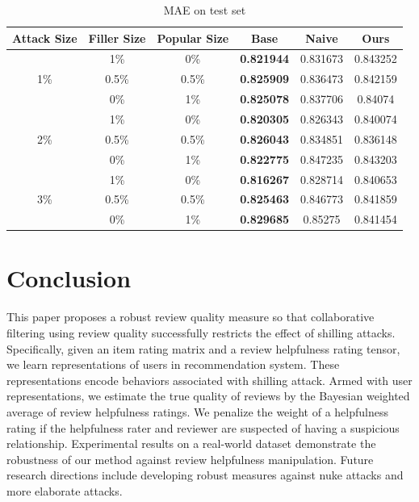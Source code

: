 \documentclass[master,english,final]{kaist-ucs}
\begin{document}
\begin{table}[h]
\caption{MAE on test set}
\label{resultMAE}
\begin{center}
\begin{tabular}{|c|c|c|c|c|c|}
\hline
\textbf{Attack Size} & \textbf{Filler Size} & \textbf{Popular Size} & \textbf{Base} & \textbf{Naive} & \textbf{Ours}     \\ \hline
\multirow{3}{*}{1\%} & 1\%                  & 0\%                   & \textbf{0.821944}      & 0.831673       & 0.843252 \\ \cline{2-6}
                     & 0.5\%               & 0.5\%                & \textbf{0.825909}      & 0.836473       & 0.842159 \\ \cline{2-6}
                     & 0\%                  & 1\%                   & \textbf{0.825078}      & 0.837706       & 0.84074  \\ \hline
\multirow{3}{*}{2\%} & 1\%                  & 0\%                   & \textbf{0.820305}      & 0.826343       & 0.840074 \\ \cline{2-6}
                     & 0.5\%               & 0.5\%                & \textbf{0.826043}      & 0.834851       & 0.836148 \\ \cline{2-6}
                     & 0\%                  & 1\%                   & \textbf{0.822775}      & 0.847235       & 0.843203 \\ \hline
\multirow{3}{*}{3\%} & 1\%                  & 0\%                   & \textbf{0.816267}      & 0.828714       & 0.840653 \\ \cline{2-6}
                     & 0.5\%               & 0.5\%                & \textbf{0.825463}      & 0.846773       & 0.841859 \\ \cline{2-6}
                     & 0\%                  & 1\%                   & \textbf{0.829685}      & 0.85275        & 0.841454 \\ \hline
\end{tabular}
\end{center}
\end{table}


\chapter{Conclusion}
This paper proposes a robust review quality measure so that collaborative filtering using review quality successfully restricts the effect of shilling attacks.
Specifically, given an item rating matrix and a review helpfulness rating tensor, we learn representations of users in recommendation system.
These representations encode behaviors associated with shilling attack.
Armed with user representations, we estimate the true quality of reviews by the Bayesian weighted average of review helpfulness ratings.
We penalize the weight of a helpfulness rating if the helpfulness rater and reviewer are suspected of having a suspicious relationship.
Experimental results on a real-world dataset demonstrate the robustness of our method against review helpfulness manipulation.
Future research directions include developing robust measures against nuke attacks and more elaborate attacks.
\end{document}
